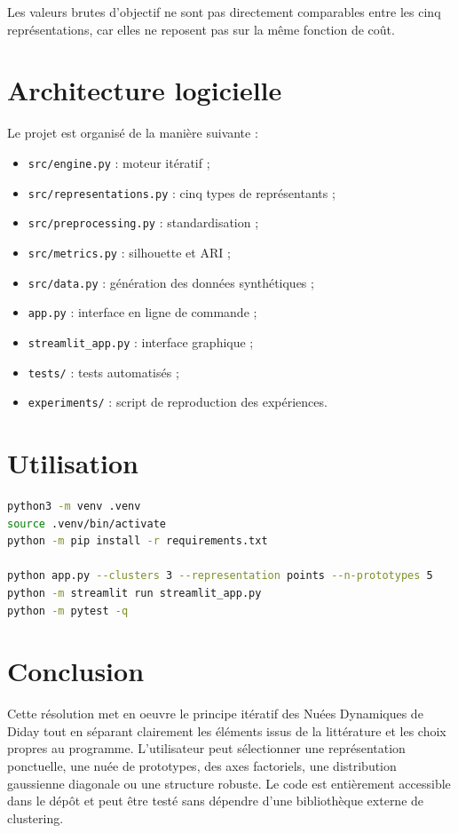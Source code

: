 \documentclass[12pt,a4paper]{article}
\begin{document}
Les valeurs brutes d'objectif ne sont pas directement comparables entre les cinq représentations, car elles ne reposent pas sur la même fonction de coût.

\section{Architecture logicielle}
Le projet est organisé de la manière suivante :
\begin{itemize}
\item \texttt{src/engine.py} : moteur itératif ;
\item \texttt{src/representations.py} : cinq types de représentants ;
\item \texttt{src/preprocessing.py} : standardisation ;
\item \texttt{src/metrics.py} : silhouette et ARI ;
\item \texttt{src/data.py} : génération des données synthétiques ;
\item \texttt{app.py} : interface en ligne de commande ;
\item \texttt{streamlit\_app.py} : interface graphique ;
\item \texttt{tests/} : tests automatisés ;
\item \texttt{experiments/} : script de reproduction des expériences.
\end{itemize}

\section{Utilisation}
\begin{lstlisting}[language=bash]
python3 -m venv .venv
source .venv/bin/activate
python -m pip install -r requirements.txt

python app.py --clusters 3 --representation points --n-prototypes 5
python -m streamlit run streamlit_app.py
python -m pytest -q
\end{lstlisting}

\section{Conclusion}
Cette résolution met en oeuvre le principe itératif des Nuées Dynamiques de Diday tout en séparant clairement les éléments issus de la littérature et les choix propres au programme. L'utilisateur peut sélectionner une représentation ponctuelle, une nuée de prototypes, des axes factoriels, une distribution gaussienne diagonale ou une structure robuste. Le code est entièrement accessible dans le dépôt et peut être testé sans dépendre d'une bibliothèque externe de clustering.
\end{document}
